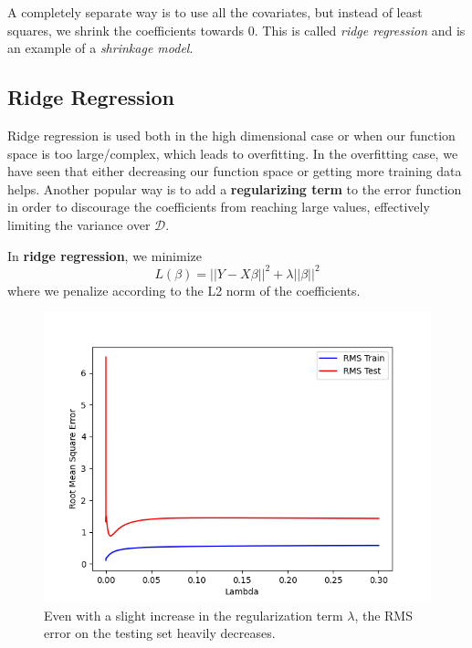 \documentclass{article}
\begin{document}
    A completely separate way is to use all the covariates, but instead of least squares, we shrink the coefficients towards $0$. This is called \textit{ridge regression} and is an example of a \textit{shrinkage model}. 

  \subsection{Ridge Regression} 

    Ridge regression is used both in the high dimensional case or when our function space is too large/complex, which leads to overfitting. In the overfitting case, we have seen that either decreasing our function space or getting more training data helps. Another popular way is to add a \textbf{regularizing term} to the error function in order to discourage the coefficients from reaching large values, effectively limiting the variance over $\mathcal{D}$. 

    \begin{definition}
      In \textbf{ridge regression}, we minimize 
      \begin{equation}
        L(\beta) = ||Y - X \beta||^2 + \lambda ||\beta||^2 
      \end{equation}
      where we penalize according to the L2 norm of the coefficients. 
    \end{definition}

    \begin{figure}[H]
      \centering
      \includegraphics[scale=0.5]{img/Lambda_vs_RMS.png}
      \caption{Even with a slight increase in the regularization term $\lambda$, the RMS error on the testing set heavily decreases. }
      \label{fig:enter-label}
    \end{figure}
\end{document}
